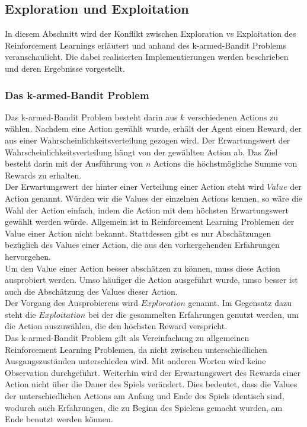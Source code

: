 \documentclass[11pt]{scrartcl}
\begin{document}
\newpage
\subsection{Exploration und Exploitation}
In diesem Abschnitt wird der Konflikt zwischen Exploration vs Exploitation des
Reinforcement Learnings erläutert und anhand des k-armed-Bandit Problems veranschaulicht.
Die dabei realisierten Implementierungen werden beschrieben und deren Ergebnisse
vorgestellt.

\subsubsection{Das k-armed-Bandit Problem}
Das k-armed-Bandit Problem besteht darin aus $k$ verschiedenen Actions zu wählen.
Nachdem eine Action gewählt wurde, erhält der Agent einen Reward, der aus einer
Wahrscheinlichkeitsverteilung gezogen wird. Der Erwartungswert der
Wahrscheinlichkeitsverteilung hängt von der gewählten Action ab. Das Ziel besteht darin
mit der Ausführung von $n$ Actions die höchstmögliche Summe von Rewards zu erhalten.\\
Der Erwartungswert der hinter einer Verteilung einer Action steht wird $Value$ der Action
genannt. Würden wir die Values der einzelnen Actions kennen, so wäre die Wahl der Action
einfach, indem die Action mit dem höchsten Erwartungswert gewählt werden würde.
Allgemein ist in Reinforcement Learning Problemen der Value einer Action nicht bekannt.
Stattdessen gibt es nur Abschätzungen bezüglich des Values einer Action, die aus den
vorhergehenden Erfahrungen hervorgehen.\\
Um den Value einer Action besser abschätzen zu können, muss diese Action ausprobiert
werden. Umso häufiger die Action ausgeführt wurde, umso besser ist auch die Abschätzung
des Values dieser Action.\\
Der Vorgang des Ausprobierens wird $Exploration$ genannt. Im Gegensatz dazu steht die
$Exploitation$ bei der die gesammelten Erfahrungen genutzt werden, um die Action
auszuwählen, die den höchsten Reward verspricht.\\
Das k-armed-Bandit Problem gilt als Vereinfachung zu allgemeinen Reinforcement Learning
Problemen, da nicht zwischen unterschiedlichen Ausgangszuständen unterschieden wird. Mit
anderen Worten wird keine Observation durchgeführt. Weiterhin wird der Erwartungswert des
Rewards einer Action nicht über die Dauer des Spiels verändert. Dies bedeutet, dass die
Values der unterschiedlichen Actions am Anfang und Ende des Spiels identisch sind, wodurch
auch Erfahrungen, die zu Beginn des Spielens gemacht wurden, am Ende benutzt werden
können.
\end{document}
